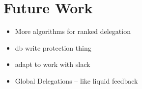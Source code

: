 \chapter{Future Work}\label{ch:future_work}

\begin{itemize}
    \item More algorithms for ranked delegation
    \item db write protection thing
    \item adapt to work with slack
    \item Global Delegations -- like liquid feedback
\end{itemize}